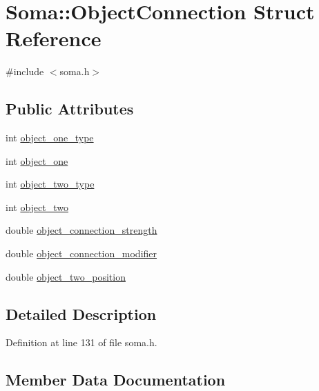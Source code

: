 \hypertarget{struct_soma_1_1_object_connection}{}\section{Soma\+:\+:Object\+Connection Struct Reference}
\label{struct_soma_1_1_object_connection}


{\ttfamily \#include $<$soma.\+h$>$}

\subsection*{Public Attributes}
\begin{DoxyCompactItemize}
\item 
int \mbox{\hyperlink{struct_soma_1_1_object_connection_aa24770c082347464b35203cd65703386}{object\+\_\+one\+\_\+type}}
\item 
int \mbox{\hyperlink{struct_soma_1_1_object_connection_ab882c137a4c8414c3663e254ccf5c27d}{object\+\_\+one}}
\item 
int \mbox{\hyperlink{struct_soma_1_1_object_connection_a948d7e2d1db9b33d3fca95f249fb48c7}{object\+\_\+two\+\_\+type}}
\item 
int \mbox{\hyperlink{struct_soma_1_1_object_connection_a6a16f602b8206114618db99a45c99e6f}{object\+\_\+two}}
\item 
double \mbox{\hyperlink{struct_soma_1_1_object_connection_aa7973892dc2435b992a657a4c1e29eb3}{object\+\_\+connection\+\_\+strength}}
\item 
double \mbox{\hyperlink{struct_soma_1_1_object_connection_a55c6abf4a7906ee1ffede53b7fa36aa6}{object\+\_\+connection\+\_\+modifier}}
\item 
double \mbox{\hyperlink{struct_soma_1_1_object_connection_a00112b17c9f78d05c2d2e684f304ec03}{object\+\_\+two\+\_\+position}}
\end{DoxyCompactItemize}


\subsection{Detailed Description}


Definition at line 131 of file soma.\+h.



\subsection{Member Data Documentation}
\mbox{\label{struct_soma_1_1_object_connection_a55c6abf4a7906ee1ffede53b7fa36aa6}} 
